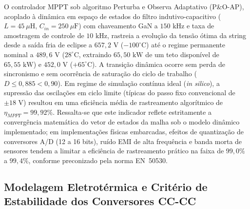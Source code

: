 O controlador MPPT sob algoritmo Perturba e Observa Adaptativo (P\&O-AP), acoplado à dinâmica em espaço de estados do filtro indutivo-capacitivo ($L = 45\ \mu\text{H}$, $C_{in} = 250\ \mu\text{F}$) com chaveamento GaN a $150\text{ kHz}$ e taxa de amostragem de controle de $10\text{ kHz}$, rastreia a evolução da tensão ótima da string desde a saída fria de eclipse a $657{,}2\text{ V}$ ($-100^\circ\text{C}$) até o regime permanente nominal a $489{,}6\text{ V}$ ($28^\circ\text{C}$, extraindo $65{,}50\text{ kW}$ de um teto disponível de $65{,}55\text{ kW}$) e $452{,}0\text{ V}$ ($+65^\circ\text{C}$). A transição dinâmica ocorre sem perda de sincronismo e sem ocorrência de saturação do ciclo de trabalho ($D \le 0{,}885 < 0{,}90$). Em regime de simulação contínua ideal (\textit{in silico}), a supressão das oscilações em ciclo limite (típicas do passo fixo convencional de $\pm 18\text{ V}$) resultou em uma eficiência média de rastreamento algorítmico de $\eta_{MPPT} = 99{,}92\%$. Ressalta-se que este indicador reflete estritamente a convergência matemática do vetor de estados da malha sob o modelo dinâmico implementado; em implementações físicas embarcadas, efeitos de quantização de conversores A/D (12 a 16 bits), ruído EMI de alta frequência e banda morta de sensores tendem a limitar a eficiência de rastreamento prático na faixa de $99{,}0\%$ a $99{,}4\%$, conforme preconizado pela norma EN~50530.

\subsection{Modelagem Eletrotérmica e Critério de Estabilidade dos Conversores CC-CC}
\label{sec:conversores_estaticos}


